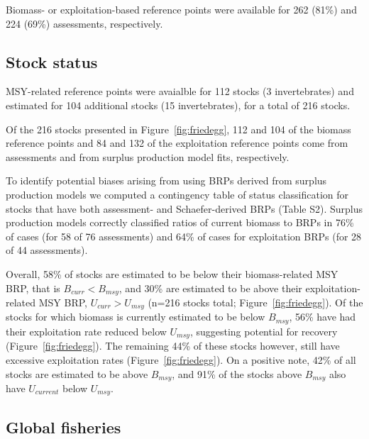Biomass- or exploitation-based reference points were available for
262 (81\%) and
224 (69\%)
assessments, respectively.

\subsection*{Stock status}
\noindent

MSY-related reference points were avaialble for
112 stocks
(3 invertebrates) and estimated
for 104 additional stocks
(15 invertebrates), for a total of
216 stocks.

Of the
216 stocks presented in
Figure~\ref{fig:friedegg}, 112 and
104 of the biomass reference points and
84 and
132 of the exploitation reference
points come from assessments and from surplus production model fits,
respectively.

To identify potential biases arising from using BRPs
derived from surplus production models we computed a contingency table
of status classification for stocks that have both assessment- and
Schaefer-derived BRPs (Table S2). Surplus production models correctly
classified ratios of current biomass to BRPs in
76\% of cases (for 58
of 76 assessments) and 64\%
of cases for exploitation BRPs (for 28 of
44 assessments).

Overall, 58\% of stocks are estimated
to be below their biomass-related MSY BRP, that is $B_{curr}<B_{msy}$,
and 30\% are estimated to be above
their exploitation-related MSY BRP, $U_{curr}>U_{msy}$
(n=216 stocks total; Figure~\ref{fig:friedegg}).
Of the stocks for which biomass is currently estimated to be below
$B_{msy}$, 56\% have had their
exploitation rate reduced below $U_{msy}$, suggesting potential for
recovery (Figure~\ref{fig:friedegg}). The remaining
44\% of these stocks however,
still have excessive exploitation rates
(Figure~\ref{fig:friedegg}). On a positive note,
42\% of all stocks are estimated to
be above $B_{msy}$, and 91\%
of the stocks above $B_{msy}$ also have $U_{current}$ below $U_{msy}$.


\subsection*{Global fisheries}


